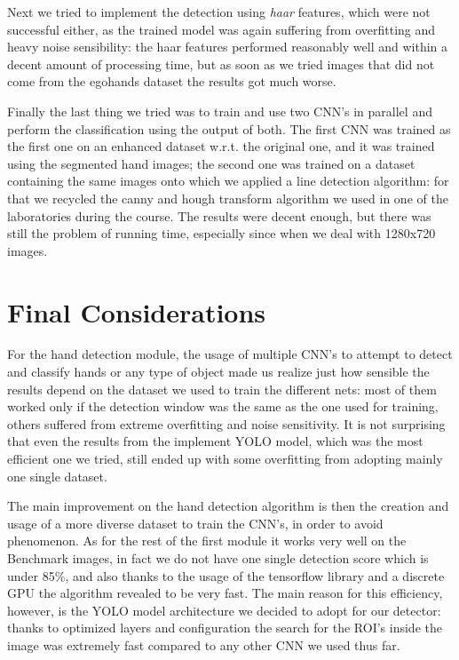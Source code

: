 Next we tried to implement the detection using \textit{haar} features, which were not successful either, as the trained model
was again suffering from overfitting and heavy noise sensibility: the haar features performed reasonably well and within a decent amount
of processing time, but as soon as we tried images that did not come from the egohands dataset the results got much worse.

Finally the last thing we tried was to train and use two CNN's in parallel and perform the classification using the output of both.
The first CNN was trained as the first one on an enhanced dataset w.r.t. the original one, and it was trained using the segmented hand images;
the second one was trained on a dataset containing the same images onto which we applied a line detection algorithm: for that we recycled the canny and 
hough transform algorithm we used in one of the laboratories during the course. The results were decent enough, but there was still the problem of running time,
especially since when we deal with 1280x720 images. 

\section{Final Considerations}
For the hand detection module, the usage of multiple CNN's to attempt to detect and classify hands or any type of object made us realize just 
how sensible the results depend on the dataset we used to train the different nets: most of them worked only if the detection window was the same 
as the one used for training, others suffered from extreme overfitting and noise sensitivity. It is not surprising that even 
the results from the implement YOLO model, which was the most efficient one we tried, still ended up with some overfitting from adopting
mainly one single dataset. 

The main improvement on the hand detection algorithm is then the creation and usage of a more diverse dataset to train the CNN's, in order to avoid phenomenon.
As for the rest of the first module it works very well on the Benchmark images, in fact we do not have one single detection score which is under 85\%, 
and also thanks to the usage of the tensorflow library and a discrete GPU the algorithm revealed to be very fast. The main reason for this efficiency, however,
is the YOLO model architecture we decided to adopt for our detector: thanks to optimized layers and configuration the search for the ROI's inside the image
was extremely fast compared to any other CNN we used thus far.

